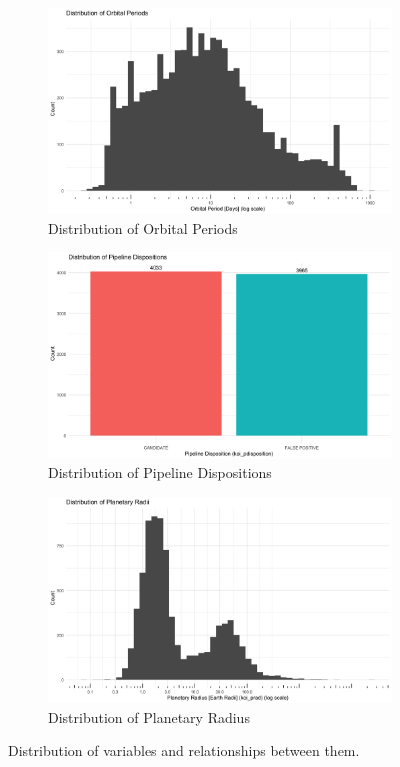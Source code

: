 \begin{figure}[H]
    \begin{subfigure}[b]{0.3\textwidth}
        \includegraphics[width=\textwidth]{Immagini/dist_orbital_periods.png}
        \caption{Distribution of Orbital Periods}
    \end{subfigure}
    \begin{subfigure}[b]{0.3\textwidth}
        \includegraphics[width=\textwidth]{Immagini/pdisp_dist.png}
        \caption{Distribution of Pipeline Dispositions}
    \end{subfigure}
    \begin{subfigure}[b]{0.3\textwidth}
        \includegraphics[width=\textwidth]{Immagini/dist_radius.png}
        \caption{Distribution of Planetary Radius}
    \end{subfigure}
    \caption{Distribution of variables and relationships between them.}
    \label{fig:plots_grid}
\end{figure}

